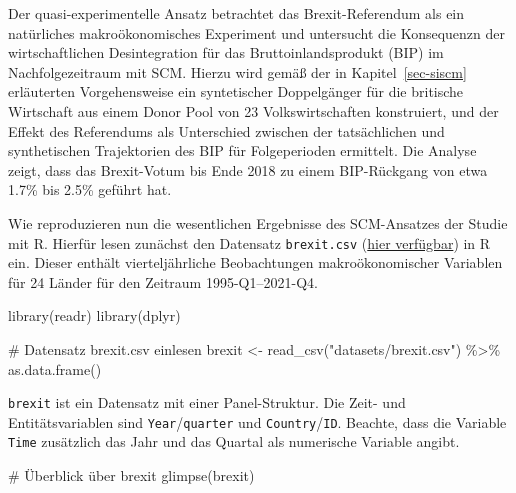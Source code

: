 \documentclass[
  a4paper,
  DIV=11,
  oneside]{scrreprt}
\newenvironment{Shaded}{\begin{snugshade}}{\end{snugshade}}
\newcommand{\CommentTok}[1]{\textcolor[rgb]{0.37,0.37,0.37}{#1}}
\newcommand{\FunctionTok}[1]{\textcolor[rgb]{0.28,0.35,0.67}{#1}}
\newcommand{\NormalTok}[1]{\textcolor[rgb]{0.00,0.23,0.31}{#1}}
\newcommand{\OtherTok}[1]{\textcolor[rgb]{0.00,0.23,0.31}{#1}}
\newcommand{\SpecialCharTok}[1]{\textcolor[rgb]{0.37,0.37,0.37}{#1}}
\newcommand{\StringTok}[1]{\textcolor[rgb]{0.13,0.47,0.30}{#1}}
\begin{document}
Der quasi-experimentelle Ansatz betrachtet das Brexit-Referendum als ein
natürliches makroökonomisches Experiment und untersucht die Konsequenzn
der wirtschaftlichen Desintegration für das Bruttoinlandsprodukt (BIP)
im Nachfolgezeitraum mit SCM. Hierzu wird gemäß der in
Kapitel~\ref{sec-siscm} erläuterten Vorgehensweise ein syntetischer
Doppelgänger für die britische Wirtschaft aus einem Donor Pool von 23
Volkswirtschaften konstruiert, und der Effekt des Referendums als
Unterschied zwischen der tatsächlichen und synthetischen Trajektorien
des BIP für Folgeperioden ermittelt. Die Analyse zeigt, dass das
Brexit-Votum bis Ende 2018 zu einem BIP-Rückgang von etwa 1.7\% bis
2.5\% geführt hat.

Wie reproduzieren nun die wesentlichen Ergebnisse des SCM-Ansatzes der
Studie mit R. Hierfür lesen zunächst den Datensatz \texttt{brexit.csv}
(\href{https://raw.githubusercontent.com/mca91/kausal_data/main/brexit.csv}{hier
verfügbar}) in R ein. Dieser enthält vierteljährliche Beobachtungen
makroökonomischer Variablen für 24 Länder für den Zeitraum
1995-Q1--2021-Q4.

\begin{Shaded}
\begin{Highlighting}[]
\FunctionTok{library}\NormalTok{(readr)}
\FunctionTok{library}\NormalTok{(dplyr)}

\CommentTok{\# Datensatz \textquotesingle{}brexit.csv\textquotesingle{} einlesen}
\NormalTok{brexit }\OtherTok{\textless{}{-}} \FunctionTok{read\_csv}\NormalTok{(}\StringTok{"datasets/brexit.csv"}\NormalTok{) }\SpecialCharTok{\%\textgreater{}\%}
  \FunctionTok{as.data.frame}\NormalTok{()}
\end{Highlighting}
\end{Shaded}

\texttt{brexit} ist ein Datensatz mit einer Panel-Struktur. Die Zeit-
und Entitätsvariablen sind \texttt{Year}/\texttt{quarter} und
\texttt{Country}/\texttt{ID}. Beachte, dass die Variable \texttt{Time}
zusätzlich das Jahr und das Quartal als numerische Variable angibt.

\begin{Shaded}
\begin{Highlighting}[]
\CommentTok{\# Überblick über \textquotesingle{}brexit\textquotesingle{}}
\FunctionTok{glimpse}\NormalTok{(brexit)}
\end{Highlighting}
\end{Shaded}
\end{document}
